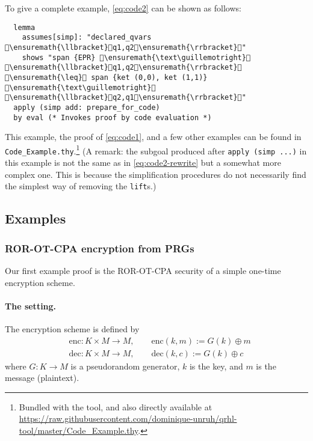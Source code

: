 \documentclass{article}
\newcommand\giturl[1]{\url{https://raw.githubusercontent.com/dominique-unruh/qrhl-tool/master/#1}}
\begin{document}
To give a complete example, \eqref{eq:code2} can be shown as follows:
\begin{lstlisting}
  lemma
    assumes[simp]: "declared_qvars \ensuremath{\llbracket}q1,q2\ensuremath{\rrbracket}"
    shows "span {EPR} \ensuremath{\text\guillemotright} \ensuremath{\llbracket}q1,q2\ensuremath{\rrbracket} \ensuremath{\leq} span {ket (0,0), ket (1,1)} \ensuremath{\text\guillemotright} \ensuremath{\llbracket}q2,q1\ensuremath{\rrbracket}"
  apply (simp add: prepare_for_code)
  by eval (* Invokes proof by code evaluation *)
\end{lstlisting}
This example, the proof of \eqref{eq:code1}, and a few other examples
can be found in \texttt{Code\_Example.thy}.\footnote{Bundled with the
  tool, and also directly available at \giturl{Code\_Example.thy}.}  (A
remark: the subgoal produced after \texttt{apply (simp ...)} in this
example is not the same as in \eqref{eq:code2-rewrite} but a somewhat
more complex one. This is because the simplification procedures do
not necessarily find the simplest way of removing the \texttt{lift}s.)

\subsection{Examples}

\newcommand\filelist[2]{\noindent\framebox{\textbf{#1 -- \texttt{#2}}}\par}

\newcommand\qrhlfile[1]{\filelist{qRHL proof script}{#1.qrhl}}
\newcommand\isafile[1]{\filelist{Isabelle/HOL theory}{#1.thy}}

\subsubsection{ROR-OT-CPA encryption from PRGs}
\label{sec:ex.ror}

Our first example proof is the ROR-OT-CPA security of a simple
one-time encryption scheme.


\paragraph{The setting.} The encryption scheme is defined by
\begin{align*}
  &\mathrm{enc}:K\times M\to M,\qquad
  \mathrm{enc}(k,m) := G(k)\oplus m \\
  &\mathrm{dec}:K\times M\to M,\qquad
  \mathrm{dec}(k,c) := G(k)\oplus c
\end{align*}
where $G:K\to M$
is a pseudorandom generator, $k$
is the key, and $m$
is the message (plaintext). 
\end{document}
